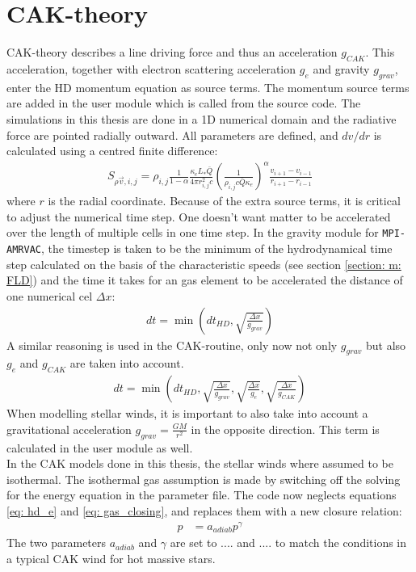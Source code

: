 \section{CAK-theory}
CAK-theory describes a line driving force and thus an acceleration $g_{CAK}$. This acceleration, together with electron scattering acceleration $g_e$ and gravity $g_{grav}$, enter the  HD momentum equation as source terms. The momentum source terms are added in the user module which is called from the source code. The simulations in this thesis are done in a 1D numerical domain and the radiative force are pointed radially outward. All parameters are defined, and $dv/dr$ is calculated using a centred finite difference:
\begin{align}
S_{\rho \vec{v},i,j} = \rho_{i,j} \frac{1}{1-\alpha} \frac{\kappa_e L_* \bar{Q}}{4\pi r_{i,j}^2 c} \left( \frac{1}{\rho_{i,j} c \bar{Q} \kappa_e} \right)^\alpha \frac{v_{i+1} - v_{i-1}}{r_{i+1} - r_{i-1}}
\end{align}
where $r$ is the radial coordinate. Because of the extra source terms, it is critical to adjust the numerical time step. One doesn't want matter to be accelerated over the length of multiple cells in one time step. In the gravity module for \texttt{MPI-AMRVAC}, the timestep is taken to be the minimum of the hydrodynamical time step calculated on the basis of the characteristic speeds (see section \ref{section: m: FLD}) and the time it takes for an gas element to be accelerated the distance of one numerical cel $\Delta x$:
\begin{align}
dt = \min\left(dt_{HD},\sqrt{\frac{\Delta x}{g_{grav}}} \right)
\end{align}
A similar reasoning is used in the CAK-routine, only now not only $g_{grav}$ but also $g_e$ and $g_{CAK}$ are taken into account.
\begin{align}
dt = \min\left(dt_{HD},\sqrt{\frac{\Delta x}{g_{grav}}},\sqrt{\frac{\Delta x}{g_{e}}},\sqrt{\frac{\Delta x}{g_{CAK}}} \right)
\end{align}
When modelling stellar winds, it is important to also take into account a gravitational acceleration $g_{grav} = \frac{GM}{r^2}$ in the opposite direction. This term is calculated in the user module as well.\\
In the CAK models done in this thesis, the stellar winds where assumed to be isothermal. The isothermal gas assumption is made by switching off the solving for the energy equation in the parameter file. The code now neglects equations \eqref{eq: hd_e} and \eqref{eq: gas_closing}, and replaces them with a new closure relation:
\begin{align}
 p &= a_{adiab} p^\gamma
\end{align}
The two parameters $a_{adiab}$ and $\gamma$ are set to .... and .... to match the conditions in a typical CAK wind for hot massive stars. \citep{Owocki2013}\\



